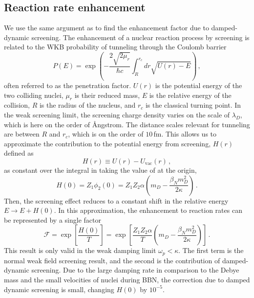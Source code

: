 \subsection{Reaction rate enhancement}
We use the same argument as \cite{Salpeter:1954nc} to find the enhancement factor due to damped-dynamic screening. The enhancement of a nuclear reaction process by screening is related to the WKB probability of tunneling through the Coulomb barrier
\begin{equation} \label{eq:penprob}
    P(E) = \exp{\left( - \frac{2\sqrt{2 \mu_r}}{\hbar c}\int_{R}^{r_c}dr \sqrt{U(r)-E}\right)}\,,
\end{equation}
often referred to as the penetration factor. $U(r)$ is the potential energy of the two colliding nuclei, $\mu_r$ is their reduced mass, $E$ is the relative energy of the collision, $R$ is the radius of the nucleus, and $r_c$ is the classical turning point. In the weak screening limit, the screening charge density varies on the scale of $\lambda_D$, which is here on the order of \AA ngstrom. The distance scales relevant for tunneling are between $R$ and $r_c$, which is on the order of $10\,$fm. This allows us to approximate the contribution to the potential energy from screening, $H(r)$ defined as
\begin{equation}
    H(r) \equiv U(r) - U_\text{vac}(r)\,,
\end{equation}
as constant over the integral in  taking the value of  at the origin,
\begin{equation}
     H(0) = Z_1\phi_2(0) = Z_1 Z_2 \alpha \left(m_D - \frac{\beta_N m_D^2}{2 \kappa}\right)\,.
\end{equation}
Then, the screening effect reduces to a constant shift in the relative energy $E \rightarrow E+H(0)$. In this approximation, the enhancement to reaction rates can be represented by a single factor \cite{Salpeter:1954nc,Kravchuk:2014sps}
\begin{equation}\label{eq:DDSenhance}
   \mathcal{F} = \exp\left[\frac{H(0)}{T} \right]=\exp\left[\frac{Z_1 Z_2 \alpha}{T} \left(m_D - \frac{\beta_N m_D^2}{2 \kappa}\right)\right]\,.
\end{equation}
This result is only valid in the weak damping limit $\omega_p<\kappa$. The first term is the normal weak field screening result, and the second is the contribution of damped-dynamic screening. Due to the large damping rate in comparison to the Debye mass and the small velocities of nuclei  during BBN, the correction due to damped dynamic screening is small, changing $H(0)$ by $10^{-5}$. 
